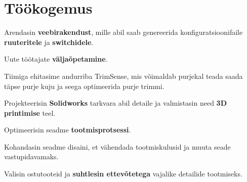 \documentclass[letterpaper]{deedy-resume} %
\begin{document}
\hfill
%
%
\begin{minipage}[t]{0.66\textwidth} %


\section{Töökogemus}


\vspace{\topsep} %
\begin{tightitemize}
  \item Arendasin \textbf{veebirakendust}, mille abil saab genereerida konfiguratsioonifaile \textbf{ruuteritele} ja \textbf{switchidele}.
  \item Uute töötajate \textbf{väljaõpetamine}.
\end{tightitemize}

\sectionspace %



\begin{tightitemize}
  \item Tiimiga ehitasime andurriba TrimSense, mis võimaldab purjekal teada saada täpse purje kuju ja seega optimeerida purje trimmi.
  \item Projekteerisin \textbf{Solidworks} tarkvara abil detaile ja valmistasin need \textbf{3D printimise} teel.
  \item Optimeerisin seadme \textbf{tootmisprotsessi}.
  \item Kohandasin seadme disaini, et vähendada tootmiskulusid ja muuta seade vastupidavamaks.
  \item Valisin ostutooteid ja \textbf{suhtlesin ettevõtetega} vajalike detailide tootmiseks.
\end{tightitemize}


\end{minipage}
\end{document}
